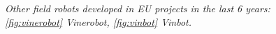 \begin{figure}
	\centering
	\qquad
	\caption{\textit{Other field robots developed in EU projects in the last 6 years: \ref{fig:vinerobot} Vinerobot, \ref{fig:vinbot} Vinbot.}}
\end{figure}


